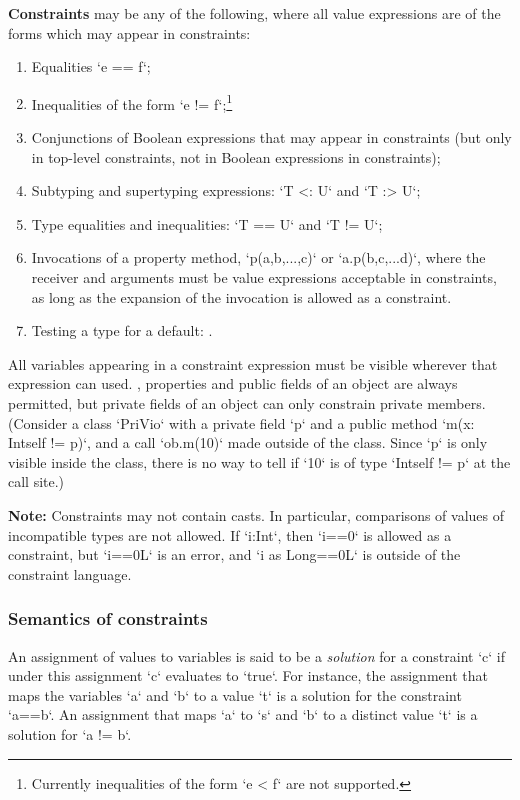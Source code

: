{\bf Constraints}  may be any of
the following, where 
all value expressions are of the forms which may appear in constraints: 
\begin{enumerate}
\item Equalities \xcd`e == f`;
\item Inequalities of the form \xcd`e != f`;\footnote{Currently inequalities
      of the form \xcd`e < f` are not supported.}
\item Conjunctions of Boolean expressions that may appear in constraints (but
      only in top-level constraints, not in Boolean expressions in constraints);
\item Subtyping and supertyping expressions: \xcd`T <: U` and \xcd`T :> U`; 
\item Type equalities and inequalities: \xcd`T == U` and \xcd`T != U`; 
\item Invocations of a property method, \xcd`p(a,b,...,c)` or
      \xcd`a.p(b,c,...d)`, where the receiver and arguments must be value
      expressions acceptable in constraints, as long as the expansion of the
      invocation is allowed as a constraint.
\item Testing a type for a default: .
\end{enumerate}

All variables appearing in a constraint expression must be visible wherever
that expression can used.  \Eg, properties and public fields of an object are
always permitted, but private fields of an object can only constrain private
members.  (Consider a class \xcd`PriVio` with a private field \xcd`p` and a
public method \xcd`m(x: Int{self != p})`, and a call \xcd`ob.m(10)` made
outside of the class. Since \xcd`p` is only visible inside the class, there is
no way to tell if \xcd`10` is of type \xcd`Int{self != p}` at the call site.)

{\bf Note:} Constraints may not contain casts.   In particular, comparisons of
values of incompatible types are not allowed.  If \xcd`i:Int`, then \xcd`i==0`
is allowed as a constraint, but \xcd`i==0L` is an error, and 
\xcd`i as Long==0L` is outside of the constraint language.


\subsubsection{Semantics of constraints}
\label{SemanticsOfConstraints}
An assignment of values to variables is said to be a {\em solution} for a
constraint \xcd`c` if under this assignment \xcd`c` evaluates to
\xcd`true`. For instance, the assignment that maps 
the variables \xcd`a` and \xcd`b` to a value \xcd`t` is a solution for
the constraint \xcd`a==b`. An assignment that maps \xcd`a` to 
\xcd`s` and \xcd`b` to a distinct value \xcd`t` is a solution for 
\xcd`a != b`. 

